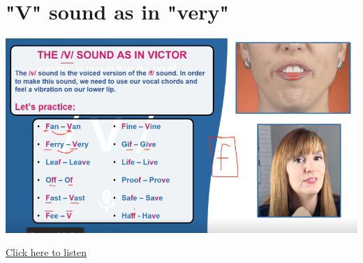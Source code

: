\section{"V" sound as in "very" }
\begin{center}
\includegraphics[width=1\textwidth]{images/v_portrait.png}
\end{center}

\href{https://drive.google.com/file/d/1C9-dVurAhFHisFtu7BXRSUUTWpi2ZDxw/view?usp=sharing}{Click here to listen}

